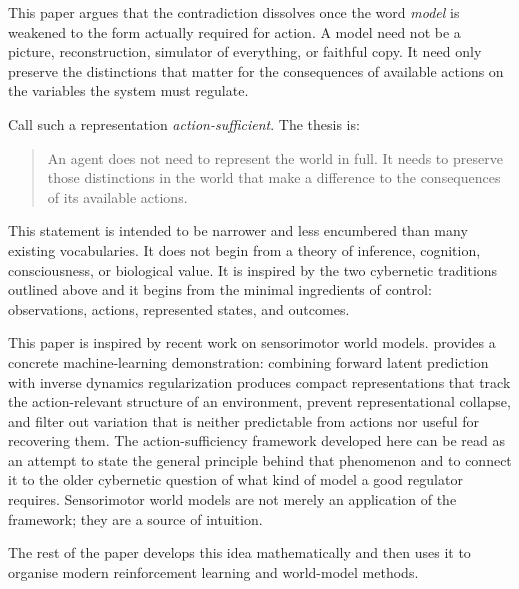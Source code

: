 \documentclass[11pt]{article}
\theoremstyle{remark}
\newcommand{\1}{\mathbb 1}
\begin{document}
This paper argues that the contradiction dissolves once the word \emph{model} is weakened to the form actually required for action. A model need not be a picture, reconstruction, simulator of everything, or faithful copy. It need only preserve the distinctions that matter for the consequences of available actions on the variables the system must regulate.

Call such a representation \emph{action-sufficient}. The thesis is:
\begin{quote}
An agent does not need to represent the world in full. It needs to preserve those distinctions in the world that make a difference to the consequences of its available actions.
\end{quote}

This statement is intended to be narrower and less encumbered than many existing vocabularies. It does not begin from a theory of inference, cognition, consciousness, or biological value. It is inspired by the two cybernetic traditions outlined above and it begins from the minimal ingredients of control: observations, actions, represented states, and outcomes.

This paper is inspired by recent work on sensorimotor world models. \citet{Ivashkov-smwm26} provides a concrete machine-learning demonstration: combining forward latent prediction with inverse dynamics regularization produces compact representations that track the action-relevant structure of an environment, prevent representational collapse, and filter out variation that is neither predictable from actions nor useful for recovering them. The action-sufficiency framework developed here can be read as an attempt to state the general principle behind that phenomenon and to connect it to the older cybernetic question of what kind of model a good regulator requires. Sensorimotor world models are not merely an application of the framework; they are a source of intuition.

The rest of the paper develops this idea mathematically and then uses it to organise modern reinforcement learning and world-model methods.
\end{document}
